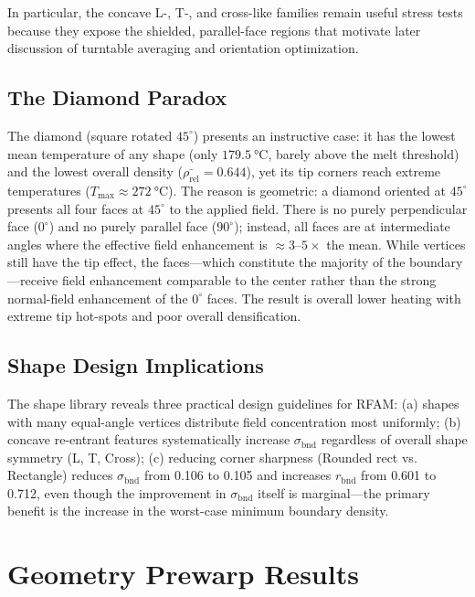 \documentclass[5p,times]{elsarticle}
\newcommand{\bndstd}{\sigma_{\mathrm{bnd}}}
\newcommand{\rhorel}{\rho_{\mathrm{rel}}}
\begin{document}
In particular, the concave L-, T-, and cross-like families remain
useful stress tests because they expose the shielded, parallel-face
regions that motivate later discussion of turntable averaging and
orientation optimization.

\subsection{The Diamond Paradox}

The diamond (square rotated $45^\circ$) presents an instructive
case: it has the lowest mean temperature of any shape (only
$\SI{179.5}{\celsius}$, barely above the melt threshold) and the
lowest overall density ($\bar{\rhorel} = 0.644$), yet its tip corners
reach extreme temperatures ($T_{\max} \approx \SI{272}{\celsius}$).
The reason is geometric: a diamond oriented at $45^\circ$ presents
all four faces at $45^\circ$ to the applied field.  There is no
purely perpendicular face ($0^\circ$) and no purely parallel face
($90^\circ$); instead, all faces are at intermediate angles where the
effective field enhancement is $\approx 3$--$5\times$ the mean.  While
vertices still have the tip effect, the faces---which constitute the
majority of the boundary---receive field enhancement comparable to the
center rather than the strong normal-field enhancement of the $0^\circ$
faces.  The result is overall lower heating with extreme tip hot-spots
and poor overall densification.

\subsection{Shape Design Implications}

The shape library reveals three practical design guidelines for RFAM:
(a) shapes with many equal-angle vertices distribute field concentration
most uniformly;
(b) concave re-entrant features systematically increase $\bndstd$
regardless of overall shape symmetry (L, T, Cross);
(c) reducing corner sharpness (Rounded rect vs. Rectangle) reduces
$\bndstd$ from 0.106 to 0.105 and increases $r_{\mathrm{bnd}}$ from
0.601 to 0.712, even though the improvement in $\bndstd$ itself is
marginal---the primary benefit is the increase in the worst-case
minimum boundary density.

\FloatBarrier
\section{Geometry Prewarp Results}
\label{sec:results_prewarp}
\end{document}

